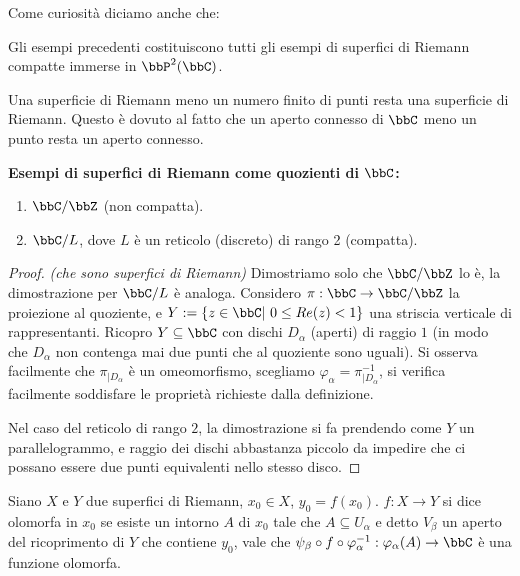 Come curiosità diciamo anche che:
\begin{divagazione}[di Chow]
    Gli esempi precedenti costituiscono tutti gli esempi di superfici di Riemann compatte immerse in $\bbP^2(\bbC)$.
\end{divagazione}
\begin{osservazione}
    Una superficie di Riemann meno un numero finito di punti resta una superficie di Riemann. Questo è dovuto al fatto che un aperto connesso di $\bbC$ meno un punto resta un aperto connesso.
\end{osservazione}


\textbf{Esempi di superfici di Riemann come quozienti di $\bbC$:}
\begin{enumerate} %
  \item $\bbC/\bbZ$ (non compatta).
  \item $\bbC/L$, dove $L$ è un reticolo (discreto) di rango 2 (compatta).
\end{enumerate}
\begin{proof} \textit{(che sono superfici di Riemann)}
    Dimostriamo solo che $\bbC/\bbZ$ lo è, la dimostrazione per $\bbC/L$ è analoga. Considero $\pi:\bbC\rightarrow\bbC/\bbZ$ la proiezione al quoziente, e $Y:=\{z\in\bbC|\ 0\leq Re(z)<1\}$ una striscia verticale di rappresentanti. Ricopro $Y\subseteq\bbC$ con dischi $D_\alpha$ (aperti) di raggio $1$ (in modo che $D_\alpha$ non contenga mai due punti che al quoziente sono uguali). Si osserva facilmente che $\pi_{|D_\alpha}$ è un omeomorfismo, scegliamo $\varphi_\alpha=\pi_{|D_\alpha}^{-1}$, si verifica facilmente soddisfare le proprietà richieste dalla definizione.

    Nel caso del reticolo di rango $2$, la dimostrazione si fa prendendo come $Y$ un parallelogrammo, e raggio dei dischi abbastanza piccolo da impedire che ci possano essere due punti equivalenti nello stesso disco.
\end{proof}

\begin{definizione}
Siano $X$ e $Y$ due superfici di Riemann, $x_0\in X$, $y_0=f(x_0)$. $f:X\rightarrow Y$ si dice olomorfa in $x_0$ se esiste un intorno $A$ di $x_0$ tale che $A\subseteq U_\alpha$ e detto $V_\beta$ un aperto del ricoprimento di $Y$ che contiene $y_0$, vale che $\psi_\beta \circ f \circ \varphi_\alpha^{-1}: \varphi_\alpha(A)\rightarrow \bbC$ è una funzione olomorfa.
\end{definizione}

